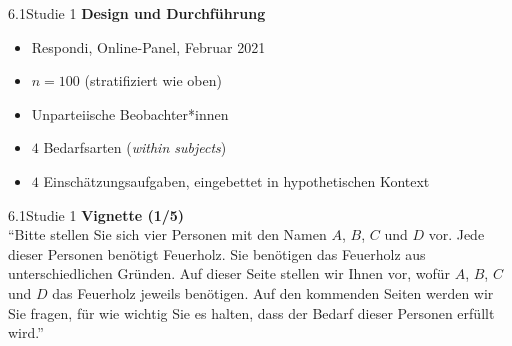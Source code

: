 \documentclass[xcolor=table,9pt,aspectratio=169]{beamer}
\begin{document}
\begin{frame}{\vspace*{10mm}6.1\hspace*{1em}Studie 1}
\textbf{Design und Durchführung}\\
\medskip
\begin{itemize}
   \item Respondi, Online-Panel, Februar 2021
   \item $n=100$ (stratifiziert wie oben)
   \item Unparteiische Beobachter*innen
   \item $4$ Bedarfsarten (\textit{within subjects})
   \item $4$ Einschätzungsaufgaben, eingebettet in hypothetischen Kontext
\end{itemize}
\end{frame}


\begin{frame}{\vspace*{10mm}6.1\hspace*{1em}Studie 1}
\textbf{Vignette (1/5)}\\
\medskip
\enquote{Bitte stellen Sie sich vier Personen mit den Namen $A$, $B$, $C$ und $D$ vor. Jede dieser Personen benötigt Feuerholz. Sie benötigen das Feuerholz aus unterschiedlichen Gründen. Auf dieser Seite stellen wir Ihnen vor, wofür $A$, $B$, $C$ und $D$ das Feuerholz jeweils benötigen. Auf den kommenden Seiten werden wir Sie fragen, für wie wichtig Sie es halten, dass der Bedarf dieser Personen erfüllt wird.}
\end{frame}
\end{document}
